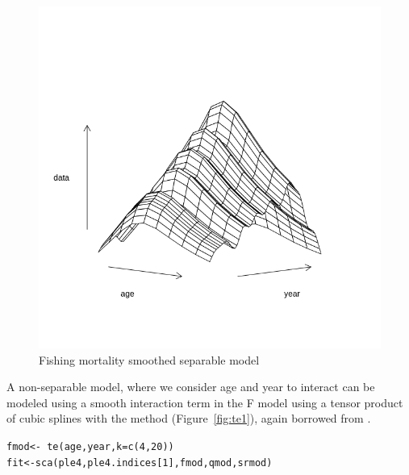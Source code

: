 \documentclass[a4paper,english,10pt]{article}\usepackage[]{graphicx}\usepackage[]{color}
\makeatletter
\newcommand{\hlnum}[1]{\textcolor[rgb]{0.063,0.58,0.627}{#1}}%
\newcommand{\hlopt}[1]{\textcolor[rgb]{0.196,0.196,0.196}{#1}}%
\newcommand{\hlstd}[1]{\textcolor[rgb]{0.196,0.196,0.196}{#1}}%
\newcommand{\hlkwb}[1]{\textcolor[rgb]{0.627,0,0.314}{#1}}%
\newcommand{\hlkwc}[1]{\textcolor[rgb]{0,0.631,0.314}{#1}}%
\newcommand{\hlkwd}[1]{\textcolor[rgb]{0.78,0.227,0.412}{#1}}%
\newenvironment{kframe}{%
 \def\at@end@of@kframe{}%
 \ifinner\ifhmode%
  \def\at@end@of@kframe{\end{minipage}}%
  \begin{minipage}{\columnwidth}%
 \fi\fi%
 \def\FrameCommand##1{\hskip\@totalleftmargin \hskip-\fboxsep
 \colorbox{shadecolor}{##1}\hskip-\fboxsep
     \hskip-\linewidth \hskip-\@totalleftmargin \hskip\columnwidth}%
 \MakeFramed {\advance\hsize-\width
   \@totalleftmargin\z@ \linewidth\hsize
   \@setminipage}}%
 {\par\unskip\endMakeFramed%
 \at@end@of@kframe}
\newenvironment{knitrout}{}{} %
\makeatother
\begin{document}
\begin{knitrout}
\color{fgcolor}\begin{figure}[H]

{\centering \includegraphics[width=.9\linewidth]{figure/sep2-1} 

}

\caption[Fishing mortality smoothed separable model]{Fishing mortality smoothed separable model}\label{fig:sep2}
\end{figure}


\end{knitrout}

A non-separable model, where we consider age and year to interact can be modeled using a smooth interaction term in the F model using a tensor product of cubic splines with the  method (Figure~\ref{fig:te1}), again borrowed from \href{http://cran.r-project.org/web/packages/mgcv/index.html}{}.

\begin{knitrout}
\color{fgcolor}\begin{kframe}
\begin{alltt}
\hlstd{fmod} \hlkwb{<-} \hlopt{~}\hlkwd{te}\hlstd{(age, year,} \hlkwc{k} \hlstd{=} \hlkwd{c}\hlstd{(}\hlnum{4}\hlstd{,} \hlnum{20}\hlstd{))}
\hlstd{fit} \hlkwb{<-} \hlkwd{sca}\hlstd{(ple4, ple4.indices[}\hlnum{1}\hlstd{], fmod, qmod, srmod)}
\end{alltt}
\end{kframe}
\end{knitrout}
\end{document}
